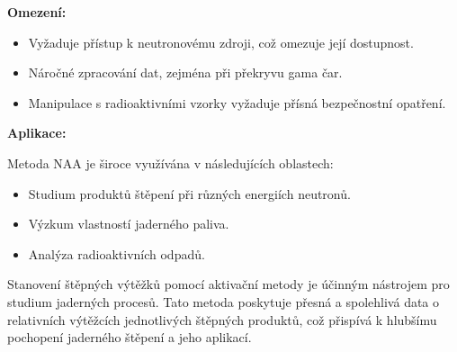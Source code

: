 \textbf{Omezení:}

\begin{itemize}
    \item Vyžaduje přístup k neutronovému zdroji, což omezuje její dostupnost.
    \item Náročné zpracování dat, zejména při překryvu gama čar.
    \item Manipulace s radioaktivními vzorky vyžaduje přísná bezpečnostní opatření.
\end{itemize}

\textbf{Aplikace:}

Metoda NAA je široce využívána v následujících oblastech:

\begin{itemize}
    \item Studium produktů štěpení při různých energiích neutronů.
    \item Výzkum vlastností jaderného paliva.
    \item Analýza radioaktivních odpadů.
\end{itemize}

Stanovení štěpných výtěžků pomocí aktivační metody je účinným nástrojem pro studium jaderných procesů. Tato metoda poskytuje přesná a spolehlivá data o relativních výtěžcích jednotlivých štěpných produktů, což přispívá k hlubšímu pochopení jaderného štěpení a jeho aplikací.
